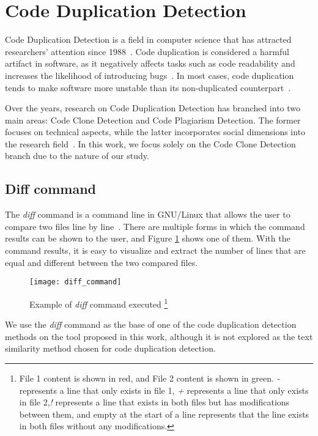 \en

\section{Code Duplication Detection}

Code Duplication Detection is a field in computer science that has attracted
researchers' attention since 1988~\citep{firstman}. Code
duplication is considered a harmful artifact in software, as it negatively
affects tasks such as code readability and increases the likelihood of
introducing bugs~\citep{harmone}. In most cases, code duplication tends to make
software more unstable than its non-duplicated counterpart~\citep{harmtwo}.

Over the years, research on Code Duplication Detection has branched into two
main areas: Code Clone Detection and Code Plagiarism Detection. The former
focuses on technical aspects, while the latter incorporates social dimensions
into the research field~\citep{litreview}. In this work, we focus solely on the
Code Clone Detection branch due to the nature of our study.


\subsection{Diff command}

The \textit{diff} command is a command line in GNU/Linux that allows the user to compare 
two files line by line~\citep{diffcommand}. There are multiple forms in which the command 
results can be shown to the user, and Figure \ref{fig:diff} shows one of them. 
With the command results, it is easy to visualize and extract the number of lines that 
are equal and different between the two compared files.

\begin{figure}
\texttt{[image: diff\_command]}
\caption[Example of \textit{diff} command executed]{
Example of \textit{diff} command executed
\footnote{
File 1 content is shown in red, and File 2 content is shown in green. \textit{-} 
represents a line that only exists in file 1, \textit{+} represents a line that only 
exists in file 2,\textit{!} represents a line that exists in both files but has modifications 
between them, and empty at the start of a line represents that the line exists in 
both files without any modifications.
}
}
\label{fig:diff}
\end{figure}

We use the \textit{diff} command as the base of one of the code duplication detection 
methods on the tool proposed in this work, although it is not explored as the text 
similarity method chosen for code duplication detection.

